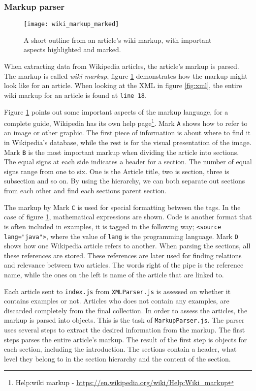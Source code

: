 \subsubsection{Markup parser}

\begin{figure}[h]
\caption{A short outline from an article's wiki markup, with important aspects highlighted and marked. }
\texttt{[image: wiki\_markup\_marked]}
\label{fig:wiki_markup}
\end{figure}

When extracting data from Wikipedia articles, the article's markup is parsed. The markup is called \textit{wiki markup}, figure \ref{fig:wiki_markup} demonstrates how the markup might look like for an article. When looking at the XML in figure \ref{fig:xml}, the entire wiki markup for an article is found at \texttt{line 18}.

Figure \ref{fig:wiki_markup} points out some important aspects of the markup language, for a complete guide, Wikipedia has its own help page\footnote{Help:wiki markup - \url{https://en.wikipedia.org/wiki/Help:Wiki_markup}}. Mark \texttt{A} shows how to refer to an image or other graphic. The first piece of information is about where to find it in Wikipedia's database, while the rest is for the visual presentation of the image. Mark \texttt{B} is the most important markup when dividing the article into sections. The equal signs at each side indicates a header for a section. The number of equal signs range from one to six. One is the Article title, two is section, three is subsection and so on. By using the hierarchy, we can both separate out sections from each other and find each sections parent section.

The markup by Mark \texttt{C} is used for special formatting between the tags. In the case of figure \ref{fig:wiki_markup}, mathematical expressions are shown. Code is another format that is often included in examples, it is tagged in the following way; \texttt{<source lang="java">}, where the value of \texttt{lang} is the programming language. Mark \texttt{D} shows how one Wikipedia article refers to another. When parsing the sections, all these references are stored. These references are later used for finding relations and relevance between two articles. The words right of the pipe is the reference name, while the ones on the left is name of the article that are linked to. 


Each article sent to \texttt{index.js} from \texttt{XMLParser.js} is assessed on whether it contains examples or not. Articles who does not contain any examples, are discarded completely from the final collection. In order to assess the articles, the markup is parsed into objects. This is the task of \texttt{MarkupParser.js}. The parser uses several steps to extract the desired information from the markup. The first steps parses the entire article's markup. The result of the first step is objects for each section, including the introduction. The sections contain a header, what level they belong to in the section hierarchy and the content of the section. 

